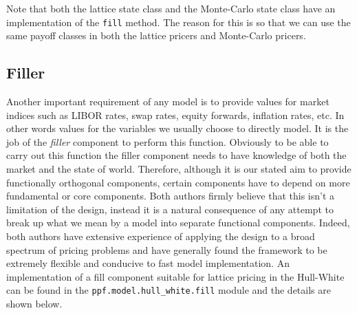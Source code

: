 Note that both the lattice state class and the Monte-Carlo state class have an implementation of the \verb|fill| method. The reason for this is so that we can use the same payoff classes 
in both the lattice pricers and Monte-Carlo pricers.

\subsection{Filler} 

Another important requirement of any model is to provide values for
market indices such as LIBOR rates, swap rates, equity forwards,
inflation rates, etc. In other words values for the variables we
usually choose to directly model. It is the job of the \emph{filler}
component to perform this function. Obviously to be able to carry out
this function the filler component needs to have knowledge of both the
market and the state of world. Therefore, although it is our stated
aim to provide functionally orthogonal components, certain components
have to depend on more fundamental or core components. Both authors
firmly believe that this isn't a limitation of the design, instead it
is a natural consequence of any attempt to break up what we mean by a
model into separate functional components. Indeed, both authors have
extensive experience of applying the design to a broad spectrum of
pricing problems and have generally found the framework to be
extremely flexible and conducive to fast model implementation. An
implementation of a fill component suitable for lattice pricing in the
Hull-White can be found in the \verb|ppf.model.hull_white.fill| module
and the details are shown below.


